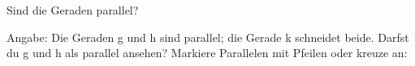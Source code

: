 \setcounter{aufgabe}{11}

\begin{aufgabe}{Sind die Geraden parallel?}
\begin{teile}
\teil Angabe: Die Geraden g und h sind parallel; die Gerade k schneidet beide. Darfst du g und h als parallel ansehen? Markiere Parallelen mit Pfeilen oder kreuze an: \\  \\ 

\end{teile}
\end{aufgabe}


